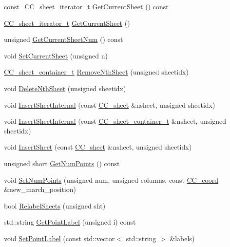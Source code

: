 \begin{DoxyCompactItemize}
\item 
\hyperlink{a00046_aaaf1345012d2f833d1c8f28f9b8593ff}{const\-\_\-\-C\-C\-\_\-sheet\-\_\-iterator\-\_\-t} \hyperlink{a00046_adb4cb7e4de718d704bc4d551f645686a}{Get\-Current\-Sheet} () const 
\item 
\hyperlink{a00046_a53c7d0b304ced90d330ea5076f1bee89}{C\-C\-\_\-sheet\-\_\-iterator\-\_\-t} \hyperlink{a00046_acdc56c2d9e6c467c2efdfbe00ccc5619}{Get\-Current\-Sheet} ()
\item 
unsigned \hyperlink{a00046_a297dfe2af2863b75367a72a66036919c}{Get\-Current\-Sheet\-Num} () const 
\item 
void \hyperlink{a00046_a30c4a359c9fea6ab3ef26346edeb03f6}{Set\-Current\-Sheet} (unsigned n)
\item 
\hyperlink{a00046_a1a6e11ead9a97c796881971059c56f37}{C\-C\-\_\-sheet\-\_\-container\-\_\-t} \hyperlink{a00046_aacfb8087126b2e5d512992407438c453}{Remove\-Nth\-Sheet} (unsigned sheetidx)
\item 
void \hyperlink{a00046_a781461aee5d186804d41bbbf9f546fdc}{Delete\-Nth\-Sheet} (unsigned sheetidx)
\item 
void \hyperlink{a00046_a419c1d3a80e1f9e22b631e7a903c8503}{Insert\-Sheet\-Internal} (const \hyperlink{a00045}{C\-C\-\_\-sheet} \&nsheet, unsigned sheetidx)
\item 
void \hyperlink{a00046_a1422a7da5eedfb6f8cac35b789af0862}{Insert\-Sheet\-Internal} (const \hyperlink{a00046_a1a6e11ead9a97c796881971059c56f37}{C\-C\-\_\-sheet\-\_\-container\-\_\-t} \&nsheet, unsigned sheetidx)
\item 
void \hyperlink{a00046_adebc091072772d8a48ee4ddd2a258c68}{Insert\-Sheet} (const \hyperlink{a00045}{C\-C\-\_\-sheet} \&nsheet, unsigned sheetidx)
\item 
unsigned short \hyperlink{a00046_af2fb2f145d3e6ca265e1b6baa3a1525e}{Get\-Num\-Points} () const 
\item 
void \hyperlink{a00046_a4ce66f3f57b8a9dc9c413ef8909cdb7b}{Set\-Num\-Points} (unsigned num, unsigned columns, const \hyperlink{a00029}{C\-C\-\_\-coord} \&new\-\_\-march\-\_\-position)
\item 
bool \hyperlink{a00046_a1d7842a7371334e6da602c14d57027b8}{Relabel\-Sheets} (unsigned sht)
\item 
std\-::string \hyperlink{a00046_a1d79c9c4eab1407d078dbe54b23b8263}{Get\-Point\-Label} (unsigned i) const 
\item 
void \hyperlink{a00046_a93a7c275dedba89b304d2875d58b5168}{Set\-Point\-Label} (const std\-::vector$<$ std\-::string $>$ \&labels)

\end{DoxyCompactItemize}
